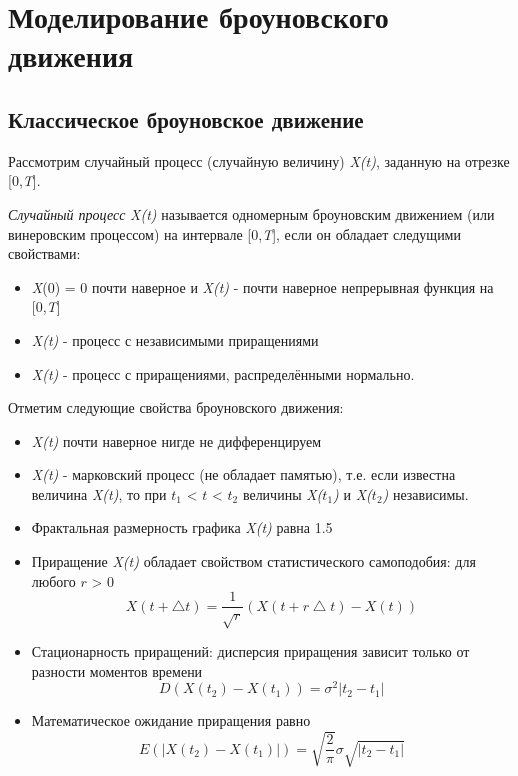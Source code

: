 \section{Моделирование броуновского движения}

\subsection{Классическое броуновское движение}

Рассмотрим случайный процесс (случайную величину) \textit{X(t)}, заданную на отрезке [0,\textit{T}].

\textit{Случайный процесс}  \textit{X(t)} называется одномерным броуновским движением (или винеровским процессом) на интервале [0,\textit{T}], если он обладает следущими свойствами:
\begin{itemize} 
\item \textit{X}(0) = 0 почти наверное и \textit{X(t)} - почти наверное непрерывная функция на [0,\textit{T}]
\item \textit{X(t)} - процесс с независимыми приращениями
\item  \textit{X(t)} -  процесс с приращениями, распределёнными нормально.
\end{itemize}

Отметим следующие свойства броуновского движения:
\begin{itemize} 
	\item \textit{X(t)} почти наверное нигде не дифференцируем 
	\item  \textit{X(t)} - марковский процесс (не обладает памятью), т.е. если известна величина \textit{X(t)}, то при $t_1$ < $t$ < $t_2$ величины \textit{X($t_1$)} и \textit{X($t_2$)} независимы.
	\item Фрактальная размерность графика \textit{X(t)} равна 1.5
	\item Приращение \textit{X(t)} обладает свойством статистического самоподобия: для любого $r$ > 0
	\begin{equation}
		X(t+ \bigtriangleup t) = \frac{1}{\sqrt{r}}(X(t+r\bigtriangleup t) - X(t))
	\end{equation}
	\item Стационарность приращений: дисперсия приращения зависит только от разности моментов времени
	\begin{equation} \label{1.6}
		D(X(t_2) - X(t_1)) = \sigma^2|t_2-t_1|
	\end{equation}
	\item Математическое ожидание приращения равно
	\begin{equation}
	E(|X(t_2) - X(t_1)|) = \sqrt{\frac{2}{\pi}}\sigma\sqrt{|t_2-t_1|}
	\end{equation}
\end{itemize}

